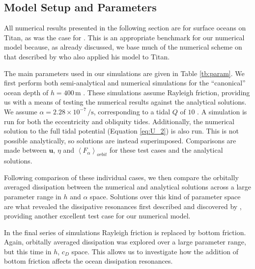 \subsection{Model Setup and Parameters \label{subsec:param}}



All numerical results presented in the following section are for surface oceans on Titan, as was the case for \citet{sears1995tidal,sohl1995tidal}. This is an appropriate benchmark for our numerical model because, as already discussed, we base much of the numerical scheme on that described by \citet{sears1995tidal} who also applied his model to Titan.

The main parameters used in our simulations are given in Table \ref{tb:param}. We first perform both semi-analytical and numerical simulations for the ``canonical'' ocean depth of $h=400 \, \si{\metre}$ \citep{sagan1982tide,sears1995tidal}. These simulations assume Rayleigh friction, providing us with a means of testing the numerical results against the analytical solutions. We assume \hbox{$\alpha = 2.28 \times 10^{-7} \, \si{\per\second}$}, corresponding to a tidal $Q$ of $10$ \citep{tyler2011tidal}. A simulation is run for both the eccentricity and obliquity tides. Additionally, the numerical solution to the full tidal potential (Equation \ref{eq:U_2}) is also run. This is not possible analytically, so solutions are instead superimposed. Comparisons are made between $\bm{u}$, $\eta$ and $\left\langle F_\alpha \right\rangle_{orbit}$ for these test cases and the analytical solutions. 

Following comparison of these individual cases, we then compare the orbitally averaged dissipation between the numerical and analytical solutions across a large parameter range in $h$ and $\alpha$ space. Solutions over this kind of parameter space are what revealed the dissipative resonances first described and discovered by \citet{tyler2011tidal}, providing another excellent test case for our numerical model.



In the final series of simulations Rayleigh friction is replaced by bottom friction. Again, orbitally averaged dissipation was explored over a large parameter range, but this time in $h$, $c_D$ space. This allows us to investigate how the addition of bottom friction affects the ocean dissipation resonances. 
